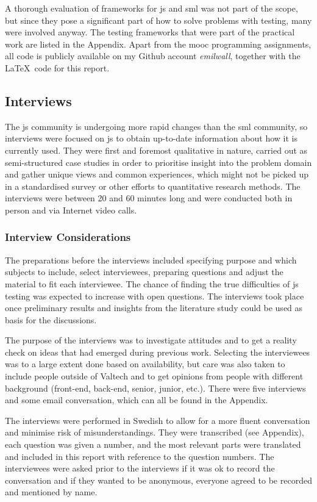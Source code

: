 \documentclass[11pt]{article}
\begin{document}
A thorough evaluation of frameworks for \gls{js} and \gls{sml} was not part of the scope, but since they pose a significant part of how to solve problems with testing, many were involved anyway. The testing frameworks that were part of the practical work are listed in the Appendix. Apart from the \gls{mooc} programming assignments, all code is publicly available on my Github account \emph{emilwall}, together with the \LaTeX~code for this report.

\subsection{Interviews}

The \gls{js} community is undergoing more rapid changes than the \gls{sml} community, so interviews were focused on \gls{js} to obtain up-to-date information about how it is currently used. They were first and foremost qualitative in nature, carried out as semi-structured case studies in order to prioritise insight into the problem domain and gather unique views and common experiences, which might not be picked up in a standardised survey or other efforts to quantitative research methods. The interviews were between 20 and 60 minutes long and were conducted both in person and via Internet video calls.

\subsubsection{Interview Considerations}

The preparations before the interviews included specifying purpose and which subjects to include, select interviewees, preparing questions and adjust the material to fit each interviewee. The chance of finding the true difficulties of \gls{js} testing was expected to increase with open questions. The interviews took place once preliminary results and insights from the literature study could be used as basis for the discussions.

The purpose of the interviews was to investigate attitudes and to get a reality check on ideas that had emerged during previous work. Selecting the interviewees was to a large extent done based on availability, but care was also taken to include people outside of Valtech and to get opinions from people with different background (front-end, back-end, senior, junior, etc.). There were five interviews and some email conversation, which can all be found in the Appendix.

The interviews were performed in Swedish to allow for a more fluent conversation and minimise risk of misunderstandings. They were transcribed (see Appendix), each question was given a number, and the most relevant parts were translated and included in this report with reference to the question numbers. The interviewees were asked prior to the interviews if it was ok to record the conversation and if they wanted to be anonymous, everyone agreed to be recorded and mentioned by name.
\end{document}
